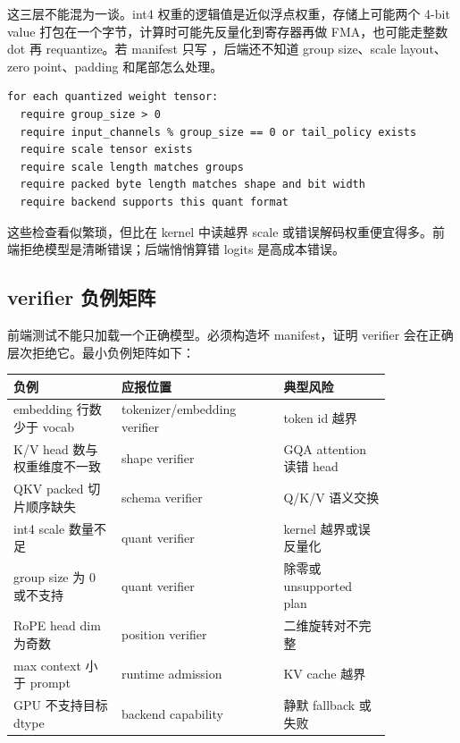 这三层不能混为一谈。int4 权重的逻辑值是近似浮点权重，存储上可能两个 4-bit value 打包在一个字节，计算时可能先反量化到寄存器再做 FMA，也可能走整数 dot 再 requantize。若 manifest 只写 ，后端还不知道 group size、scale layout、zero point、padding 和尾部怎么处理。

\begin{lstlisting}[numbers=none,caption={量化权重 verifier 要检查的边界}]
for each quantized weight tensor:
  require group_size > 0
  require input_channels % group_size == 0 or tail_policy exists
  require scale tensor exists
  require scale length matches groups
  require packed byte length matches shape and bit width
  require backend supports this quant format
\end{lstlisting}

这些检查看似繁琐，但比在 kernel 中读越界 scale 或错误解码权重便宜得多。前端拒绝模型是清晰错误；后端悄悄算错 logits 是高成本错误。

\subsection{verifier 负例矩阵}

前端测试不能只加载一个正确模型。必须构造坏 manifest，证明 verifier 会在正确层次拒绝它。最小负例矩阵如下：

\begin{center}
\begin{tabular}{p{0.24\linewidth}p{0.36\linewidth}p{0.24\linewidth}}
\toprule
负例 & 应报位置 & 典型风险 \\
\midrule
embedding 行数少于 vocab & tokenizer/embedding verifier & token id 越界 \\
K/V head 数与权重维度不一致 & shape verifier & GQA attention 读错 head \\
QKV packed 切片顺序缺失 & schema verifier & Q/K/V 语义交换 \\
int4 scale 数量不足 & quant verifier & kernel 越界或误反量化 \\
group size 为 0 或不支持 & quant verifier & 除零或 unsupported plan \\
RoPE head dim 为奇数 & position verifier & 二维旋转对不完整 \\
max context 小于 prompt & runtime admission & KV cache 越界 \\
GPU 不支持目标 dtype & backend capability & 静默 fallback 或失败 \\
\bottomrule
\end{tabular}
\end{center}

